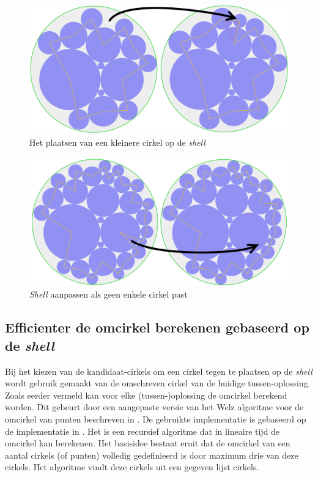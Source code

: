 \documentclass[12pt,a4paper,oneside]{book}
\begin{document}
\begin{figure}
  \centering
  \includegraphics[width=1.0\textwidth]{plaats-op-shell-kleiner_arrow.png}
  \caption{Het plaatsen van een kleinere cirkel op de \textit{shell}} \label{fig:plaats-op-shell-kleiner}
\end{figure}

\begin{figure}
  \centering
  \includegraphics[width=1.0\textwidth]{plaats-op-shell-geen-enkele-past_arrow.png}
  \caption{\textit{Shell} aanpassen als geen enkele cirkel past} \label{fig:plaats-op-shell-geen-enkele-past}
\end{figure}

\subsection{Efficienter de omcirkel berekenen gebaseerd op de \textit{shell}}

Bij het kiezen van de kandidaat-cirkels om een cirkel tegen te plaatsen op de \textit{shell} wordt gebruik gemaakt van de omschreven cirkel van de huidige tussen-oplossing.
Zoals eerder vermeld kan voor elke (tussen-)oplossing de omcirkel berekend worden.
Dit gebeurt door een aangepaste versie van het Welz algoritme voor de omcirkel van punten beschreven in \cite{welzl1991smallest}.
De gebruikte implementatie is gebaseerd op de implementatie in \cite{sunshine2008welzl}.
Het is een recursief algoritme dat in lineaire tijd de omcirkel kan berekenen.
Het basisidee bestaat eruit dat de omcirkel van een aantal cirkels (of punten) volledig gedefinieerd is door maximum drie van deze cirkels.
Het algoritme vindt deze cirkels uit een gegeven lijst cirkels.
\end{document}
